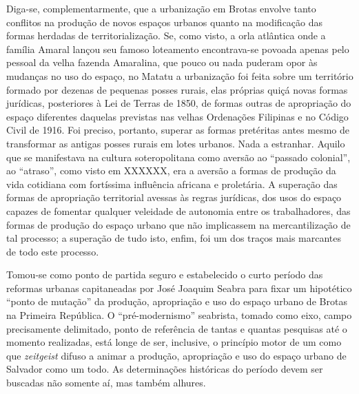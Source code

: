 Diga-se, complementarmente, que a urbanização em Brotas envolve tanto conflitos na produção de novos espaços urbanos quanto na modificação das formas herdadas de territorialização. Se, como visto, a orla atlântica onde a família Amaral lançou seu famoso loteamento encontrava-se povoada apenas pelo pessoal da velha fazenda Amaralina, que pouco ou nada puderam opor às mudanças no uso do espaço, no Matatu a urbanização foi feita sobre um território formado por dezenas de pequenas posses rurais, elas próprias quiçá novas formas jurídicas, posteriores à Lei de Terras de 1850, de formas outras de apropriação do espaço diferentes daquelas previstas nas velhas Ordenações Filipinas e no Código Civil de 1916. Foi preciso, portanto, superar as formas pretéritas antes mesmo de transformar as antigas posses rurais em lotes urbanos. Nada a estranhar. Aquilo que se manifestava na cultura soteropolitana como aversão ao ``passado colonial'', ao ``atraso'', como visto em XXXXXX, era a aversão a formas de produção da vida cotidiana com fortíssima influência africana e proletária. A superação das formas de apropriação territorial avessas às regras jurídicas, dos usos do espaço capazes de fomentar qualquer veleidade de autonomia entre os trabalhadores, das formas de produção do espaço urbano que não implicassem na mercantilização de tal processo; a superação de tudo isto, enfim, foi um dos traços mais marcantes de todo este processo.

Tomou-se como ponto de partida seguro e estabelecido o curto período das reformas urbanas capitaneadas por José Joaquim Seabra para fixar um hipotético ``ponto de mutação'' da produção, apropriação e uso do espaço urbano de Brotas na Primeira República.  O ``pré-modernismo'' seabrista, tomado como eixo, campo precisamente delimitado, ponto de referência de tantas e quantas pesquisas até o momento realizadas, está longe de ser, inclusive, o princípio motor de um como que \textit{zeitgeist} difuso a animar a produção, apropriação e uso do espaço urbano de Salvador como um todo. As determinações históricas do período devem ser buscadas não somente aí, mas também alhures. 

